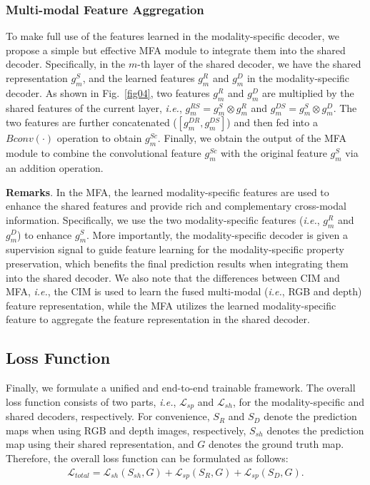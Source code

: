 \documentclass[10pt,twocolumn,letterpaper]{article}
\def\ie{\emph{i.e.}}
\begin{document}
\subsubsection{Multi-modal Feature Aggregation}
\label{MFA}

To make full use of the features learned in the modality-specific decoder, we propose a simple but effective MFA module to integrate them into the shared decoder. Specifically, in the $m$-th layer of the shared decoder, we have the shared representation $g_m^S$, and the learned features $g_m^R$ and $g_m^D$ in the modality-specific decoder. As shown in Fig.~\ref{fig04}, two features $g_m^R$ and $g_m^D$ are multiplied by the shared features of the current layer, \ie, $g_m^{RS}=g_m^S\otimes{g_m^R}$ and $g_m^{DS}=g_m^S\otimes{g_m^D}$. The two features are further concatenated ($[g_m^{DR},g_m^{DS}]$) and then fed into a $Bconv(\cdot)$ operation to obtain $g_m^{Sc}$. Finally, we obtain the output of the MFA module to combine the convolutional feature $g_m^{Sc}$ with the original feature $g_m^S$ via an addition operation.


\textbf{Remarks}. In the MFA, the learned modality-specific features are used to enhance the shared features and provide rich and complementary cross-modal information. Specifically, we use the two modality-specific features (\ie, $g_m^R$ and $g_m^D$) to enhance $g_m^S$. More importantly, the modality-specific decoder is given a supervision signal to guide feature learning for the modality-specific property preservation, which benefits the final prediction results when integrating them into the shared decoder. We also note that the differences between CIM and MFA, \ie, the CIM is used to learn the fused multi-modal (\ie, RGB and depth) feature representation, while the MFA utilizes the learned modality-specific feature to aggregate the feature representation in the shared decoder.



\subsection{Loss Function}
\label{sec3.4}

Finally, we formulate a unified and end-to-end trainable framework. The overall loss function consists of two parts, \ie, $\mathcal{L}_{sp}$ and $\mathcal{L}_{sh}$, for the modality-specific and shared decoders, respectively. For convenience, $S_{R}$ and $S_{D}$ denote the prediction maps when using RGB and depth images, respectively, $S_{sh}$ denotes the prediction map using their shared representation, and $G$ denotes the ground truth map. Therefore, the overall loss function can be formulated as follows:
\begin{equation}
\begin{aligned}
\mathcal{L}_{total}=\mathcal{L}_{sh}(S_{sh},G)+\mathcal{L}_{sp}(S_R,G)+\mathcal{L}_{sp}(S_D,G).
\end{aligned}
\label{eq3}
\end{equation}
\end{document}

